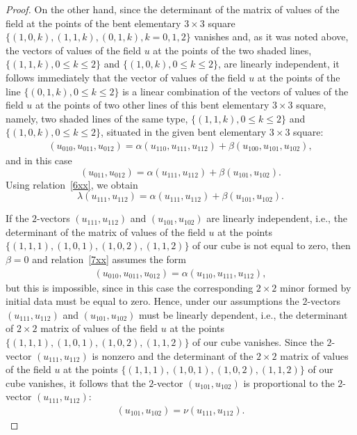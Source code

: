 \documentclass[pdftex]{sigma}
\begin{document}
\begin{proof}
On the other hand, since the determinant of the matrix of values of
the f\/ield at the points of the bent elementary $3 \times 3$ square
$\{(1, 0, k), (1, 1, k), (0, 1, k), k = 0, 1, 2\}$ vanishes and, as
it was noted above, the vectors of values of the f\/ield $u$ at the
points of the two shaded lines, $\{(1, 1, k), 0 \leq k \leq 2\}$ and
$\{(1, 0, k), 0 \leq k \leq 2\}$, are linearly independent, it
follows immediately that the vector of values of the f\/ield $u$ at
the points of the line $\{(0, 1, k), 0 \leq k \leq 2\}$ is a linear
combination of the vectors of values of the f\/ield $u$ at the points
of two other lines of this bent elementary $3 \times 3$ square,
namely, two shaded lines of the same type, $\{(1, 1, k), 0 \leq k
\leq 2\}$ and $\{(1, 0, k), 0 \leq k \leq 2\}$, situated in the
given bent elementary $3 \times 3$ square:
\begin{gather} (u_{0 1 0}, u_{0 1 1}, u_{0 1 2}) = \alpha (u_{1 1 0}, u_{1 1
1}, u_{1 1 2}) + \beta (u_{1 0 0}, u_{1 0 1}, u_{1 0 2}),
\label{7xx}
\end{gather}
and in this case \[ (u_{0 1 1}, u_{0 1 2}) = \alpha
(u_{1 1 1}, u_{1 1 2}) + \beta (u_{1 0 1}, u_{1 0 2}). \] Using
relation~\eqref{6xx}, we obtain \[ \lambda (u_{1 1 1}, u_{1 1 2}) =
\alpha (u_{1 1 1}, u_{1 1 2}) + \beta (u_{1 0 1}, u_{1 0 2}). \]


If the $2$-vectors $(u_{1 1 1}, u_{1 1 2})$ and $(u_{1 0 1}, u_{1 0
2})$ are linearly independent, i.e., the determinant of the matrix
of values of the f\/ield $u$ at the points $\{(1, 1, 1), (1, 0, 1),
(1, 0, 2), (1, 1, 2)\}$ of our cube is not equal to zero, then
$\beta = 0$ and relation~\eqref{7xx} assumes the form
\begin{gather*}
(u_{0 1 0}, u_{0 1 1}, u_{0 1 2}) = \alpha (u_{1 1 0}, u_{1 1 1}, u_{1 1
2}), %
\end{gather*}
but this is impossible, since in this case the
corresponding $2 \times 2$ minor formed by initial data must be
equal to zero.
Hence, under our assumptions the $2$-vectors $(u_{1 1 1}, u_{1 1
2})$ and $(u_{1 0 1}, u_{1 0 2})$ must be linearly dependent, i.e.,
the determinant of $2 \times 2$ matrix of values of the f\/ield $u$ at
the points $\{(1, 1, 1), (1, 0, 1), (1, 0, 2), (1, 1, 2)\}$ of our
cube vanishes. Since the $2$-vector $(u_{1 1 1}, u_{1 1 2})$ is
nonzero and the determinant of the $2 \times 2$ matrix of values of
the f\/ield $u$ at the points $\{(1, 1, 1), (1, 0, 1), (1, 0, 2), (1,
1, 2)\}$ of our cube vanishes, it follows that the $2$-vector $(u_{1
0 1}, u_{1 0 2})$ is proportional to the $2$-vector $(u_{1 1 1},
u_{1 1 2})$: \begin{gather} (u_{1 0 1}, u_{1 0 2}) = \nu (u_{1 1 1}, u_{1 1
2}). \label{9xx}
\end{gather}



\end{proof}
\end{document}
